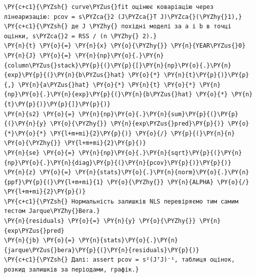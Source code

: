 \begin{Verbatim}[commandchars=\\\{\}]
\PY{c+c1}{\PYZsh{} curve\PYZus{}fit оцінює коваріацію через лінеаризацію: pcov = s\PYZca{}2 (J\PYZca{}T J)\PYZca{}(\PYZhy{}1),}
\PY{c+c1}{\PYZsh{} де J \PYZhy{} похідні моделі за a і b в точці оцінки, s\PYZca{}2 = RSS / (n \PYZhy{} 2).}
\PY{n}{t} \PY{o}{=} \PY{n}{x} \PY{o}{\PYZhy{}} \PY{n}{YEAR\PYZus{}0}
\PY{n}{J} \PY{o}{=} \PY{n}{np}\PY{o}{.}\PY{n}{column\PYZus{}stack}\PY{p}{(}\PY{p}{[}\PY{n}{np}\PY{o}{.}\PY{n}{exp}\PY{p}{(}\PY{n}{b\PYZus{}hat} \PY{o}{*} \PY{n}{t}\PY{p}{)}\PY{p}{,} \PY{n}{a\PYZus{}hat} \PY{o}{*} \PY{n}{t} \PY{o}{*} \PY{n}{np}\PY{o}{.}\PY{n}{exp}\PY{p}{(}\PY{n}{b\PYZus{}hat} \PY{o}{*} \PY{n}{t}\PY{p}{)}\PY{p}{]}\PY{p}{)}
\PY{n}{s2} \PY{o}{=} \PY{n}{np}\PY{o}{.}\PY{n}{sum}\PY{p}{(}\PY{p}{(}\PY{n}{y} \PY{o}{\PYZhy{}} \PY{n}{exp\PYZus{}pred}\PY{p}{)} \PY{o}{*}\PY{o}{*} \PY{l+m+mi}{2}\PY{p}{)} \PY{o}{/} \PY{p}{(}\PY{n}{n} \PY{o}{\PYZhy{}} \PY{l+m+mi}{2}\PY{p}{)}
\PY{n}{se} \PY{o}{=} \PY{n}{np}\PY{o}{.}\PY{n}{sqrt}\PY{p}{(}\PY{n}{np}\PY{o}{.}\PY{n}{diag}\PY{p}{(}\PY{n}{pcov}\PY{p}{)}\PY{p}{)}
\PY{n}{z} \PY{o}{=} \PY{n}{stats}\PY{o}{.}\PY{n}{norm}\PY{o}{.}\PY{n}{ppf}\PY{p}{(}\PY{l+m+mi}{1} \PY{o}{\PYZhy{}} \PY{n}{ALPHA} \PY{o}{/} \PY{l+m+mi}{2}\PY{p}{)}
\PY{c+c1}{\PYZsh{} Нормальність залишків NLS перевіряємо тим самим тестом Jarque\PYZhy{}Bera.}
\PY{n}{residuals} \PY{o}{=} \PY{n}{y} \PY{o}{\PYZhy{}} \PY{n}{exp\PYZus{}pred}
\PY{n}{jb} \PY{o}{=} \PY{n}{stats}\PY{o}{.}\PY{n}{jarque\PYZus{}bera}\PY{p}{(}\PY{n}{residuals}\PY{p}{)}
\PY{c+c1}{\PYZsh{} Далі: assert pcov = s²(JᵀJ)⁻¹, таблиця оцінок, розкид залишків за періодами, графік.}
\end{Verbatim}
